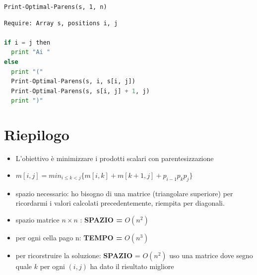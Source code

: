 \texttt{Print-Optimal-Parens(s, 1, n)}
\begin{lstlisting}[language=Python, mathescape=true]
Require: Array s, positions i, j

if i = j then
  print "Ai "
else
  print "("
  Print-Optimal-Parens(s, i, s[i, j])
  Print-Optimal-Parens(s, s[i, j] + 1, j)
  print ")"
\end{lstlisting}

\section{Riepilogo}

\begin{itemize}
  \item
        L'obiettivo è minimizzare i prodotti scalari con parentesizzazione
  \item
        $m[i,j] = min_{i \leq k < j} \{ m[i,k] + m[k+1, j] + p_{i-1} p_k p_j\}$
  \item
        spazio necessario: ho bisogno di una matrice (triangolare superiore)
        per ricordarmi i valori calcolati precedentemente, riempita per
        diagonali.
  \item
        spazio matrice $n \times n$ : \textbf{SPAZIO =} $O(n^2)$
  \item
        per ogni cella pago n: \textbf{TEMPO =} $O(n^3)$
  \item
        per ricorstruire la soluzione: \textbf{SPAZIO} = $O(n^2)$ uso una
        matrice dove segno quale $k$ per ogni $(i,j)$ ha dato il risultato
        migliore
\end{itemize}
